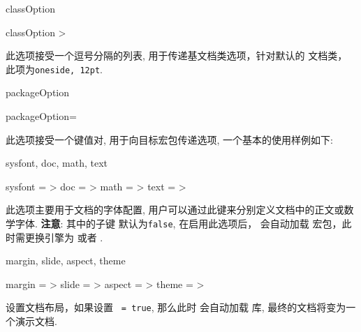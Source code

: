 \begin{keyval}[rEXP, updated=2024-11-05]{classOption}
  \begin{syntax}
    classOption >
  \end{syntax}
  此选项接受一个逗号分隔的列表, 用于传递基文档类选项，针对默认的  文档类，
  此项为\texttt{oneside, 12pt}.
\end{keyval}


\begin{keyval}[rEXP, updated=2024-11-20]{packageOption}
  \begin{syntax}
    packageOption= 
  \end{syntax}
  此选项接受一个键值对, 用于向目标宏包传递选项, 一个基本的使用样例如下:
\end{keyval}



\begin{keyval}[updated=2024-12-06, parent=ztex/font]{sysfont, doc, math, text}
  \begin{syntax}
    sysfont = >
    doc     = >
    math    = >
    text    = >
  \end{syntax}
  此选项主要用于文档的字体配置, 用户可以通过此键来分别定义文档中的正文或数学字体. 
  \textbf{注意}: 其中的子键  默认为\texttt{false}, 在启用此选项后，\ztex{} 会自动加载
   宏包，此时需更换引擎为 或者 . 
\end{keyval}


\begin{keyval}[rEXP, updated=2024-11-05, parent=ztex/layout]{margin, slide, aspect, theme}
  \begin{syntax}
    margin = >
    slide  = >
    aspect = >
    theme  = >
  \end{syntax}
  设置文档布局，如果设置 \texttt{ = true}, 那么此时 \ztex{} 会自动加载  库, 
  最终的文档将变为一个演示文档.
\end{keyval}


